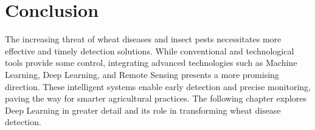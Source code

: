 


\section{Conclusion}

The increasing threat of wheat diseases and insect pests necessitates more effective and timely detection solutions. While conventional and technological tools provide some control, integrating advanced technologies such as Machine Learning, Deep Learning, and Remote Sensing presents a more promising direction. These intelligent systems enable early detection and precise monitoring, paving the way for smarter agricultural practices. The following chapter explores Deep Learning in greater detail and its role in transforming wheat disease detection.
